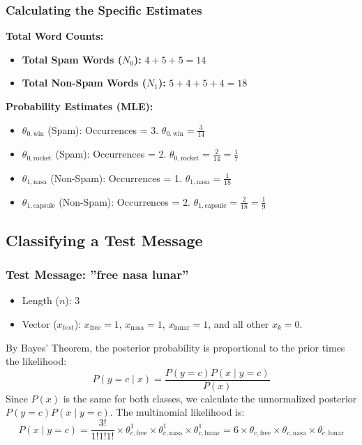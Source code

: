 \documentclass[twoside, 10pt]{article}
\begin{document}
\subsubsection{Calculating the Specific Estimates}
\textbf{Total Word Counts:}
\begin{itemize}
    \item \textbf{Total Spam Words ($N_0$):} $4 + 5 + 5 = 14$
    \item \textbf{Total Non-Spam Words ($N_1$):} $5 + 4 + 5 + 4 = 18$
\end{itemize}
\textbf{Probability Estimates (MLE):}
\begin{itemize}
    \item \textbf{$\theta_{0,\text{win}}$} (Spam): Occurrences = 3. $\theta_{0,\text{win}} = \frac{3}{14}$
    \item \textbf{$\theta_{0,\text{rocket}}$} (Spam): Occurrences = 2. $\theta_{0,\text{rocket}} = \frac{2}{14} = \frac{1}{7}$
    \item \textbf{$\theta_{1,\text{nasa}}$} (Non-Spam): Occurrences = 1. $\theta_{1,\text{nasa}} = \frac{1}{18}$
    \item \textbf{$\theta_{1,\text{capsule}}$} (Non-Spam): Occurrences = 2. $\theta_{1,\text{capsule}} = \frac{2}{18} = \frac{1}{9}$
\end{itemize}
\subsection{Classifying a Test Message}
\subsubsection{Test Message{:} {''}free nasa lunar{''}}
\begin{itemize}
    \item Length ($n$): 3
    \item Vector ($x_{test}$): $x_{\text{free}}=1$, $x_{\text{nasa}}=1$, $x_{\text{lunar}}=1$, and all other $x_k=0$.
\end{itemize}
By Bayes' Theorem, the posterior probability is proportional to the prior times the likelihood:
\[
P(y=c \mid x) = \frac{P(y=c) P(x \mid y=c)}{P(x)}
\]
Since $P(x)$ is the same for both classes, we calculate the unnormalized posterior $P(y=c)P(x \mid y=c)$. The multinomial likelihood is:
\[
P(x \mid y=c) = \frac{3!}{1!1!1!} \times \theta_{c,\text{free}}^1 \times \theta_{c,\text{nasa}}^1 \times \theta_{c,\text{lunar}}^1 = 6 \times \theta_{c,\text{free}} \times \theta_{c,\text{nasa}} \times \theta_{c,\text{lunar}}
\]
\end{document}
